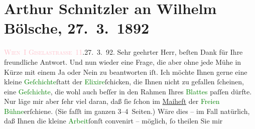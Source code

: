 

               \section[Arthur Schnitzler an Wilhelm Bölsche, 27. 3. 1892]{ Arthur Schnitzler an Wilhelm Bölsche, 27. 3. 1892}\nopagebreak{}\rehead{ }\normalsize\beginnumbering{} \toendnotes[C]{\smallbreak\pagebreak[2]} 
\toendnotes[C]{\smallbreak}\pstart
           {\pb}\textcolor{pink}{\textsc{Wien I Giselastraße 11}}{}\ledrightnote{\textcolor{pink}{Bösendorferstraße}}.\hfill 27. 3. 92.\pend
           \pstart{}Sehr geehrter Herr,\pend\pstart
           beſten Dank für Ihre freundliche Antwort. Und nun wieder eine Frage, die aber
                    ohne jede Mühe in Kürze mit einem Ja oder Nein zu beantworten iſt. Ich möchte
                    Ihnen gerne eine kleine \textcolor{green}{Geſchichte}{}ſtatt der \textcolor{green}{Elixire}{}\ledrightnote{\textcolor{green}{Die drei Elixire}}{ }ſchicken, die Ihnen nicht zu gefallen
                    ſcheinen, \introOben{}eine \textcolor{green}{Geſchichte}{}\introOben{}, die wohl auch beſſer in den Rahmen Ihres \textcolor{green}{Blattes}{} paſſen dürfte. Nur läge mir aber ſehr viel
                    daran, daß ſie ſchon im \uline{Maiheft} der \textcolor{green}{Freien Bühne}{}\ledrightnote{\textcolor{green}{Freie Bühne für modernes Leben}}{ }{\pb}erſchiene. (Sie faſſt im ganzen 3–4 Seiten.) Wäre dies
                    – im Fall natürlich, daß Ihnen die kleine \textcolor{green}{Arbeit}{}ſonſt convenirt – möglich, ſo theilen Sie mir
